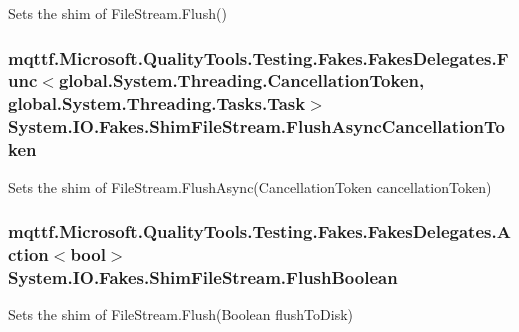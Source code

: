 Sets the shim of File\-Stream.\-Flush()

\hypertarget{class_system_1_1_i_o_1_1_fakes_1_1_shim_file_stream_a422d3301399ea9596e07de8d1592d61a}{
\subsubsection[{Flush\-Async\-Cancellation\-Token}]{\setlength{\rightskip}{0pt plus 5cm}mqttf.\-Microsoft.\-Quality\-Tools.\-Testing.\-Fakes.\-Fakes\-Delegates.\-Func$<$global.\-System.\-Threading.\-Cancellation\-Token, global.\-System.\-Threading.\-Tasks.\-Task$>$ System.\-I\-O.\-Fakes.\-Shim\-File\-Stream.\-Flush\-Async\-Cancellation\-Token\hspace{0.3cm}{\ttfamily [set]}}}\label{class_system_1_1_i_o_1_1_fakes_1_1_shim_file_stream_a422d3301399ea9596e07de8d1592d61a}


Sets the shim of File\-Stream.\-Flush\-Async(\-Cancellation\-Token cancellation\-Token)

\hypertarget{class_system_1_1_i_o_1_1_fakes_1_1_shim_file_stream_ac5a08e313ae16e55fdb7e9b97a02e477}{
\subsubsection[{Flush\-Boolean}]{\setlength{\rightskip}{0pt plus 5cm}mqttf.\-Microsoft.\-Quality\-Tools.\-Testing.\-Fakes.\-Fakes\-Delegates.\-Action$<$bool$>$ System.\-I\-O.\-Fakes.\-Shim\-File\-Stream.\-Flush\-Boolean\hspace{0.3cm}{\ttfamily [set]}}}\label{class_system_1_1_i_o_1_1_fakes_1_1_shim_file_stream_ac5a08e313ae16e55fdb7e9b97a02e477}


Sets the shim of File\-Stream.\-Flush(\-Boolean flush\-To\-Disk)

